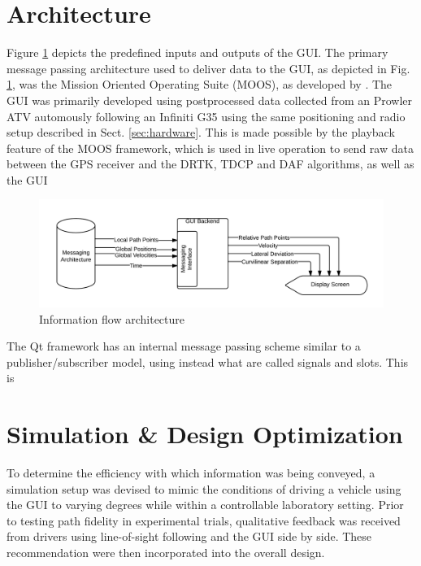 \documentclass[12pt]{report}
\begin{document}
\section{Architecture}
\label{sec:arch}
Figure \ref{fig:blackboxflow} depicts the predefined inputs and outputs of the GUI. The primary message passing architecture used to deliver data to the GUI, as depicted in Fig. \ref{fig:blackboxflow}, was the Mission Oriented Operating Suite (MOOS), as developed by \cite{moos}. The GUI was primarily developed using postprocessed data collected from an Prowler ATV automously following an Infiniti G35 using the same positioning and radio setup described in Sect. \ref{sec:hardware}. This is made possible by the playback feature of the MOOS framework, which is used in live operation to send raw data between the GPS receiver and the DRTK, TDCP and DAF algorithms, as well as the GUI

\begin{figure}[htbp]
    \centering
    \includegraphics[width=6.5in]{./figs/blackbox_flowchart.png}
    \caption{Information flow architecture}
    \label{fig:blackboxflow}
\end{figure}

The Qt framework has an internal message passing scheme similar to a publisher/subscriber model, using instead what are called signals and slots. This is 

\section{Simulation \& Design Optimization}
\label{sec:simopt}

To determine the efficiency with which information was being conveyed, a simulation setup was devised to mimic the conditions of driving a vehicle using the GUI to varying degrees while within a controllable laboratory setting. Prior to testing path fidelity in experimental trials, qualitative feedback was received from drivers using line-of-sight following and the GUI side by side. These recommendation were then incorporated into the overall design.
\end{document}
